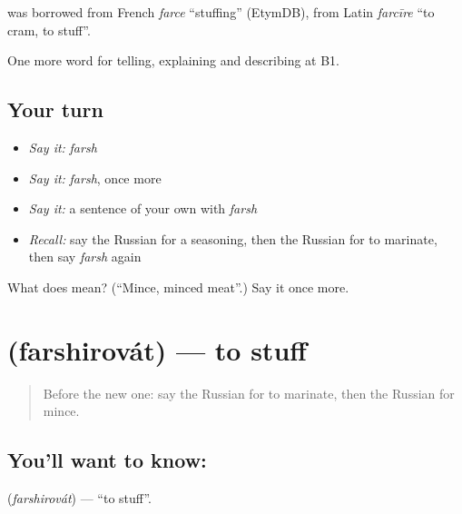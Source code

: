 \begin{cousinweb}
\emph{} was borrowed from French \emph{farce} \textquotedblleft{}stuffing\textquotedblright{} (EtymDB), from Latin \emph{farcīre} \textquotedblleft{}to cram, to stuff\textquotedblright{}.
\end{cousinweb}

\begin{grammarlens}[title={What you've built}]
One more word for telling, explaining and describing at B1.
\end{grammarlens}

\subsection*{Your turn}
\begin{itemize}
\raggedright
  \item \emph{Say it:} \emph{farsh}
  \item \emph{Say it:} \emph{farsh}, once more
  \item \emph{Say it:} a sentence of your own with \emph{farsh}
  \item \emph{Recall:} say the Russian for a seasoning, then the Russian for to marinate, then say \emph{farsh} again
\end{itemize}

\begin{tcolorbox}[breakable,colback=teal!4,colframe=teal!35!black,title={Before you move on}]
What does  mean? (\textquotedblleft{}Mince, minced meat\textquotedblright{}.) Say it once more.
\end{tcolorbox}
\section[\texorpdfstring{\ru{фаршировать} (farshirovát)}{фаршировать (farshirovát)}]{ (farshirovát) — to stuff}

\label{lesson:RU-C334-farshirovat}



\begin{quote}
Before the new one: say the Russian for to marinate, then the Russian for mince.
\end{quote}

\subsection*{You'll want to know: }
\textbf{} (\emph{farshirovát}) — \textquotedblleft{}to stuff\textquotedblright{}.


